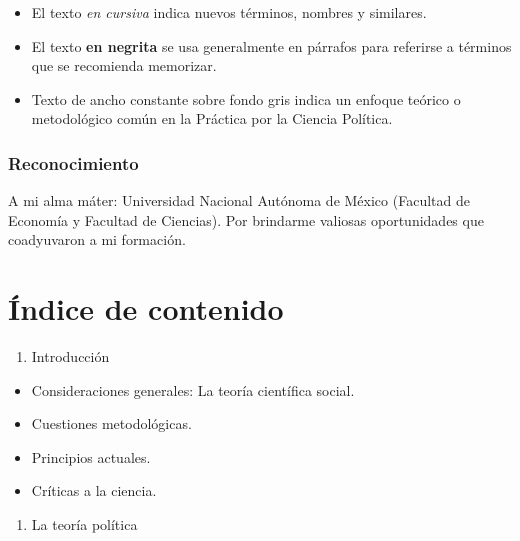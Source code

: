 \documentclass[
]{book}
\providecommand{\tightlist}{%
  \setlength{\itemsep}{0pt}\setlength{\parskip}{0pt}}
\begin{document}
\begin{itemize}
\item
  El texto \emph{en cursiva} indica nuevos términos, nombres y similares.
\item
  El texto \textbf{en negrita} se usa generalmente en párrafos para referirse a términos que se recomienda memorizar.
\item
  Texto de ancho constante sobre fondo gris indica un enfoque teórico o metodológico común en la Práctica por la Ciencia Política.
\end{itemize}

\hypertarget{reconocimiento}{%
\subsubsection*{Reconocimiento}\label{reconocimiento}}

A mi alma máter: Universidad Nacional Autónoma de México (Facultad de Economía y Facultad de Ciencias). Por brindarme valiosas oportunidades que coadyuvaron a mi formación.

\hypertarget{uxedndice-de-contenido}{%
\section*{Índice de contenido}\label{uxedndice-de-contenido}}

\begin{enumerate}
\def\labelenumi{\arabic{enumi}.}
\tightlist
\item
  Introducción
\end{enumerate}

\begin{itemize}
\tightlist
\item
  Consideraciones generales: La teoría científica social.
\item
  Cuestiones metodológicas.
\item
  Principios actuales.
\item
  Críticas a la ciencia.
\end{itemize}

\begin{enumerate}
\def\labelenumi{\arabic{enumi}.}
\setcounter{enumi}{1}
\tightlist
\item
  La teoría política
\end{enumerate}
\end{document}
